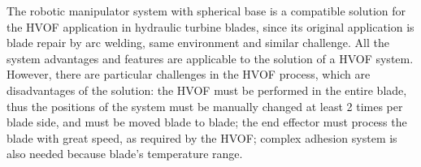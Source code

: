 


The robotic manipulator system with spherical base is a compatible solution
for the HVOF application in hydraulic turbine blades, since its
original application is blade repair by arc welding, same environment and
similar challenge. All the system advantages and features are applicable to
the solution of a HVOF system. However, there are particular challenges in the
HVOF process, which are disadvantages of the solution: the HVOF must be
performed in the entire blade, thus the positions of the system must be
manually changed at least 2 times per blade side, and must be moved blade to
blade; the end effector must process the blade with great speed, as required
by the HVOF; complex adhesion system is also needed because blade's temperature
range.

